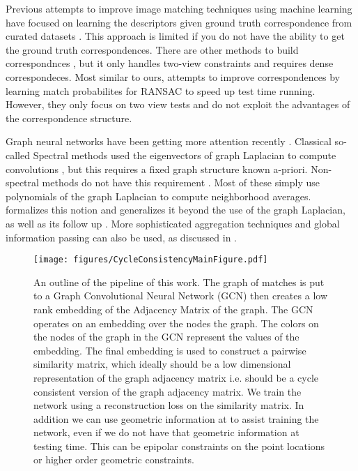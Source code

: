 \documentclass[10pt,twocolumn,letterpaper]{article}
\begin{document}
Previous attempts to improve image matching techniques using machine learning have focused on learning the descriptors given ground truth correspondence from curated datasets \cite{zagoruyko2015learning, yi2016lift, brachmann2017dsac}. This approach is limited if you do not have the ability to get the ground truth correspondences.
There are other methods to build correspondnces \cite{choy2016universal}, but it only handles two-view constraints and requires dense correspondeces.
Most similar to ours, \cite{yi2018learning} attempts to improve correspondences by learning match probabilites for RANSAC to speed up test time running. However, they only focus on two view tests and do not exploit the advantages of the correspondence structure.

Graph neural networks have been getting more attention recently 
\cite{bronstein2017geometric, bruna2013spectral, defferrard2016convolutional, kipf2016semi, scarselli2009graph, gama2018mimo, gama2018convolutional, battaglia2018relational}.
Classical so-called Spectral methods used the eigenvectors of graph Laplacian to compute convolutions \cite{bronstein2017geometric}, but this requires a fixed graph structure known a-priori.  
Non-spectral methods do not have this requirement \cite{bronstein2017geometric, kipf2016semi, scarselli2009graph, gama2018convolutional}. Most of these simply use polynomials of the graph Laplacian to compute neighborhood averages. \cite{gama2018mimo} formalizes this notion and generalizes it beyond the use of the graph Laplacian, as well as its follow up \cite{gama2018convolutional}. More sophisticated aggregation techniques and global information passing can also be used, as discussed in \cite{battaglia2018relational}.

\begin{figure*}[t]
\begin{center}
  \texttt{[image: figures/CycleConsistencyMainFigure.pdf]}
\end{center}
  \caption{
    An outline of the pipeline of this work.
    The graph of matches is put to a Graph Convolutional Neural Network (GCN) \cite{kipf2016semi} then creates a low rank embedding of the Adjacency Matrix of the graph.
    The GCN operates on an embedding over the nodes the graph.
    The colors on the nodes of the graph in the GCN represent the values of the embedding.
    The final embedding is used to construct a pairwise similarity matrix, which ideally should be a low dimensional representation of the graph adjacency matrix i.e. should be a cycle consistent version of the graph adjacency matrix.
    We train the network using a reconstruction loss on the similarity matrix.
    In addition we can use geometric information at to assist training the network, even if we do not have that geometric information at testing time.
    This can be epipolar constraints on the point locations or higher order geometric constraints.
  }
\label{fig:pipeline}
\label{fig:onecol}
\end{figure*}
\end{document}
